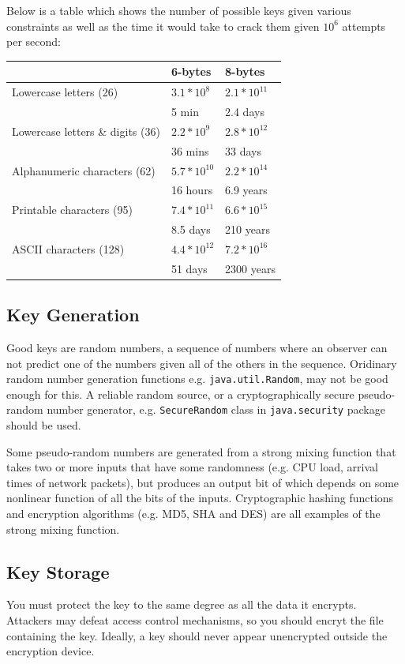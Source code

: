 \documentclass{article}
\begin{document}
Below is a table which shows the number of possible keys given various constraints as well as the time it would take to crack them given $10^{6}$ attempts per second:
\begin{center}
  \begin{tabular}{lll}
    \hline
    & 6-bytes & 8-bytes \\
    \hline
    Lowercase letters (26) & $3.1 * 10^{8}$ & $2.1 * 10^{11}$ \\
    & 5 min & 2.4 days \\
    Lowercase letters \& digits (36) & $2.2 * 10^{9}$ & $2.8 * 10^{12}$ \\
    & 36 mins & 33 days \\
    Alphanumeric characters (62) & $5.7 * 10^{10}$ & $2.2 * 10^{14}$ \\
    & 16 hours & 6.9 years \\
    Printable characters (95) & $7.4 * 10^{11}$ & $6.6 * 10^{15}$ \\
    & 8.5 days & 210 years \\
    ASCII characters (128) & $4.4 * 10^{12}$ & $7.2 * 10^{16}$ \\
    & 51 days & 2300 years
  \end{tabular}
\end{center}

\subsection{Key Generation}
Good keys are random numbers, a sequence of numbers where an observer can not predict one of the numbers given all of the others in the sequence. Oridinary random number generation functions e.g. \texttt{java.util.Random}, may not be good enough for this. A reliable random source, or a cryptographically secure pseudo-random number generator, e.g. \texttt{SecureRandom} class in \texttt{java.security} package should be used.

Some pseudo-random numbers are generated from a strong mixing function that takes two or more inputs that have some randomness (e.g. CPU load, arrival times of network packets), but produces an output bit of which depends on some nonlinear function of all the bits of the inputs. Cryptographic hashing functions and encryption algorithms (e.g. MD5, SHA and DES) are all examples of the strong mixing function.

\subsection{Key Storage}
You must protect the key to the same degree as all the data it encrypts. Attackers may defeat access control mechanisms, so you should encryt the file containing the key. Ideally, a key should never appear unencrypted outside the encryption device.
\end{document}
